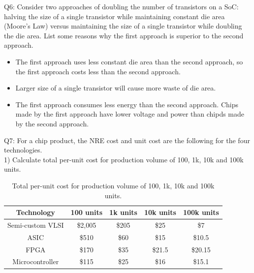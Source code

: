 \documentclass[a4paper]{article}
\begin{document}
Q6: Consider two approaches of doubling the number of transistors on a SoC: halving the size of a single transistor while maintaining constant die area (Moore’s Law) versus maintaining the size of a single transistor while doubling the die area. List some reasons why the first approach is superior to the second approach.
\begin{itemize}
    \item The first approach uses less constant die area than the second approach, so the first approach costs less than the second approach.
    \item Larger size of a single transistor will cause more waste of die area.
    \item The first approach consumes less energy than the second approach. Chips made by the first approach have lower voltage and power than chipds made by the second approach.
\end{itemize}

Q7: For a chip product, the NRE cost and unit cost are the following for the four technologies.\\
1) Calculate total per-unit cost for production volume of 100, 1k, 10k and 100k units.
\begin{table}[H]
    \centering
    \begin{tabular}{|c|c|c|c|c|}
        \hline
        Technology&100 units&1k units&10k units&100k units\\
        \hline
        Semi-custom VLSI&\$2,005&\$205&\$25&\$7\\
        \hline
        ASIC&\$510&\$60&\$15&\$10.5\\
        \hline
        FPGA&\$170&\$35&\$21.5&\$20.15\\
        \hline
        Microcontroller&\$115&\$25&\$16&\$15.1\\
        \hline
    \end{tabular}
    \caption{Total per-unit cost for production volume of 100, 1k, 10k and 100k units.}
\end{table}
\end{document}
